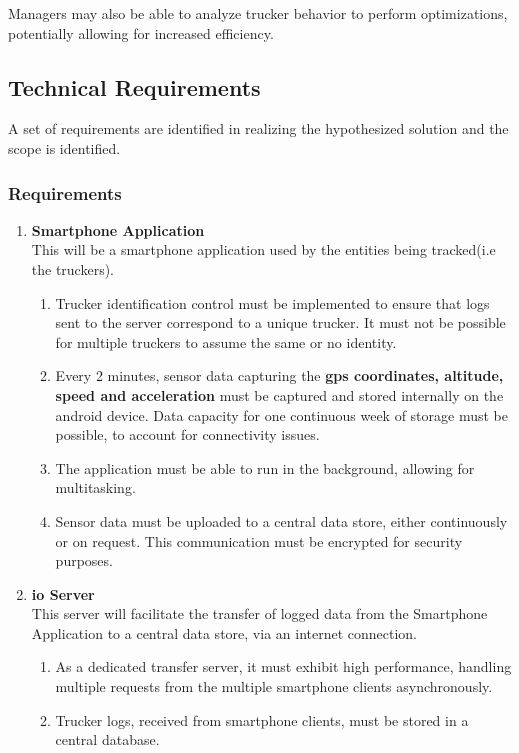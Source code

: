 Managers may also be able to analyze trucker behavior to perform optimizations, potentially allowing for increased efficiency.

\subsection{Technical Requirements}
A set of requirements are identified in realizing the hypothesized solution and the scope is identified. 

\subsubsection{Requirements}
\begin{enumerate}
\item \textbf{Smartphone Application}\\
    This will be a smartphone application used by the entities being tracked(i.e the truckers).
    \begin{enumerate}
        \item Trucker identification control must be implemented to ensure that logs sent to the server correspond to a unique trucker. It must not be possible for multiple truckers to assume the same or no identity.
        \item Every 2 minutes, sensor data capturing the \textbf{\ac{gps} coordinates, altitude, speed and acceleration} must be captured and stored internally on the android device. 
        Data capacity for one continuous week of storage must be possible, to account for connectivity issues.
        \item The application must be able to run in the background, allowing for multitasking.
        \item Sensor data must be uploaded to a central data store, either continuously or on request. This communication must be encrypted for security purposes.
    \end{enumerate}
\item \textbf{\ac{io} Server}\\
This server will facilitate the transfer of logged data from the Smartphone Application to a central data store, via an internet connection. 
    \begin{enumerate}
        \item As a dedicated transfer server, it must exhibit high performance, handling multiple requests from the multiple smartphone clients asynchronously.
        \item Trucker logs, received from smartphone clients, must be stored in a central database.

\end{enumerate}
\end{enumerate}
